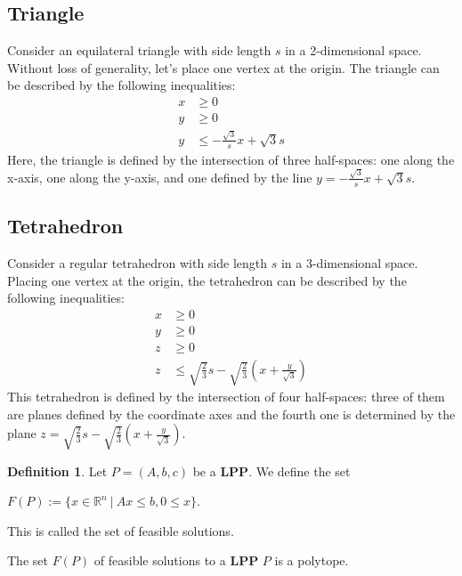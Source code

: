 \documentclass[]{article}
\theoremstyle{definition}
\newtheorem{definition}{Definition}[section]
\theoremstyle{definition}
\newcommand{\bb}{\mathbb}
\begin{document}
\subsection*{Triangle}

Consider an equilateral triangle with side length \( s \) in a 2-dimensional space. Without loss of generality, let's place one vertex at the origin. The triangle can be described by the following inequalities:
\begin{align*}
x &\geq 0 \\
y &\geq 0 \\
y &\leq -\frac{\sqrt{3}}{s}x + \sqrt{3}s
\end{align*}
Here, the triangle is defined by the intersection of three half-spaces: one along the x-axis, one along the y-axis, and one defined by the line \( y = -\frac{\sqrt{3}}{s}x + \sqrt{3}s \).

\subsection*{Tetrahedron}

Consider a regular tetrahedron with side length \( s \) in a 3-dimensional space. Placing one vertex at the origin, the tetrahedron can be described by the following inequalities:
\begin{align*}
x &\geq 0 \\
y &\geq 0 \\
z &\geq 0 \\
z &\leq \sqrt{\frac{2}{3}}s - \sqrt{\frac{2}{3}} \left( x + \frac{y}{\sqrt{3}} \right)
\end{align*}
This tetrahedron is defined by the intersection of four half-spaces: three of them are planes defined by the coordinate axes and the fourth one is determined by the plane \( z = \sqrt{\frac{2}{3}}s - \sqrt{\frac{2}{3}} \left( x + \frac{y}{\sqrt{3}} \right) \).



\begin{definition}
	Let $P = (A, b, c)$ be a \textbf{LPP}. We define the set 
	
	\begin{center}
		$F(P) := \{ x \in \bb{R}^n\ | \ Ax \leq b, 0 \leq x\}$.
	\end{center}

	This is called the set of feasible solutions.
	 
\end{definition}

The set $F(P)$ of feasible solutions to a \textbf{LPP} $P$ is a polytope.
\end{document}
